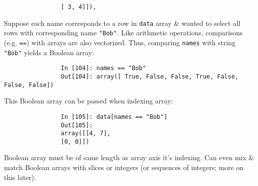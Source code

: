 \documentclass{article}
\begin{document}
\begin{itemize}
\begin{itemize}
\begin{itemize}
\begin{verbatim}
				[ 3, 4]]),
			\end{verbatim}
			Suppose each name corresponds to a row in {\tt data} array \& wanted to select all rows with corresponding name {\tt"Bob"}. Like arithmetic operations, comparisons (e.g. {\tt==}) with arrays are also vectorized. Thus, comparing {\tt names} with string {\tt"Bob"} yields a Boolean array:
			\begin{verbatim}
				In [104]: names == "Bob"
				Out[104]: array([ True, False, False, True, False, False, False])
			\end{verbatim}
			This Boolean array can be passed when indexing array:
			\begin{verbatim}
				In [105]: data[names == "Bob"]
				Out[105]:
				array([[4, 7],
				[0, 0]])
			\end{verbatim}
			Boolean array must be of same length as array axis it's indexing. Can even mix \& match Boolean arrays with slices or integers (or sequences of integers; more on this later).
			

\end{itemize}
\end{itemize}
\end{itemize}
\end{document}
